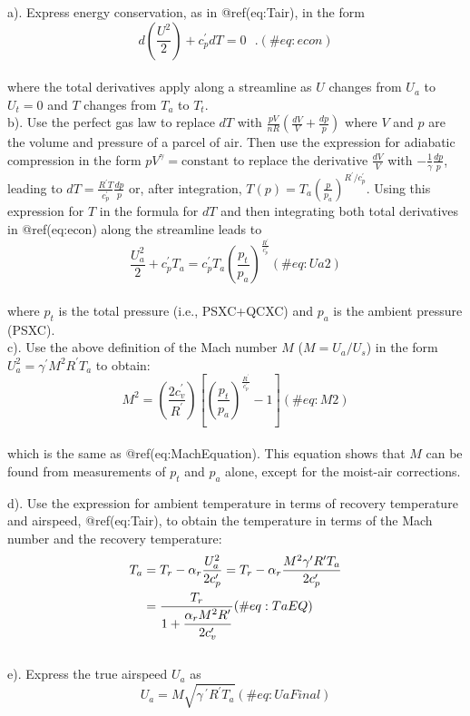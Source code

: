 \documentclass[
  english,
]{book}
\begin{document}
a). Express energy conservation, as in @ref(eq:Tair), in the form\\
\begin{equation}
d\left(\frac{U^{2}}{2}\right)+c_{p}^{\prime}dT=0\,\,\,\,.
(\#eq:econ)
\end{equation}\\
where the total derivatives apply along a streamline as \(U\) changes
from \(U_a\) to \(U_t=0\) and \(T\) changes from \(T_a\) to \(T_t\).\\
b). Use the perfect gas law to replace \(dT\) with
\(\frac{pV}{nR}(\frac{dV}{V}+\frac{dp}{p})\) where \(V\) and \(p\) are
the volume and pressure of a parcel of air. Then use the expression for
adiabatic compression in the form \(pV^\gamma = \mathrm{constant}\) to
replace the derivative \(\frac{dV}{V}\) with
\(-\frac{1}{\gamma}\frac{dp}{p}\), leading to
\(dT=\frac{R^{\prime}T}{c_{p}^{\prime}}\frac{dp}{p}\) or, after
integration,
\(T(p)=T_{a}\left(\frac{p}{p_{a}}\right)^{R^{\prime}/c_{p}^{\prime}}\).
Using this expression for \(T\) in the formula for \(dT\) and then
integrating both total derivatives in @ref(eq:econ) along the streamline
leads to\\
\begin{equation}
\frac{U_{a}^{2}}{2}+c_{p}^{\prime}T_{a}=c_{p}^{\prime}T_{a}\left(\frac{p_{t}}{p_{a}}\right)^{\frac{R^{\prime}}{c_{p}^{\prime}}}
(\#eq:Ua2)
\end{equation}\\
where \(p_t\) is the total pressure (i.e., PSXC+QCXC) and \(p_a\) is the
ambient pressure (PSXC).\\
c). Use the above definition of the Mach number \(M\) (\(M=U_a/U_s\)) in
the form \(U_a^2=\gamma^\prime M^2 R^\prime T_a\) to obtain:\\
\begin{equation}
M^{2}=\left(\frac{2c_{v}^{\prime}}{R^{\prime}}\right)\left[\left(\frac{p_{t}}{p_{a}}\right)^{\frac{R^{\prime}}{c_{p}^{\prime}}}-1\right]
(\#eq:M2)
\end{equation}\\
which is the same as @ref(eq:MachEquation). This equation shows that
\(M\) can be found from measurements of \(p_t\) and \(p_a\) alone,
except for the moist-air corrections.

d). Use the expression for ambient temperature in terms of recovery
temperature and airspeed, @ref(eq:Tair), to obtain the temperature in
terms of the Mach number and the recovery temperature:\\
\begin{align}
T_{a} & = T_{r}-\alpha_{r}\frac{U_{a}^{2}}{2c_{p}^{\prime}}=T_{r}-\alpha_{r}\frac{M^{2}\gamma^{\prime}R^{\prime}T_{a}}{2c_{p}^{\prime}}\notag\\  
& = \frac{T_{r}}{1+\dfrac{\alpha_{r}M^{2}R^{\prime}}{2c_{v}^{\prime}}}  
(\#eq:TaEQ)
\end{align} \\
e). Express the true airspeed \(U_a\) as\\
\begin{equation}
U_{a}=M\sqrt{\gamma\,^{\prime}R^{\prime}T_{a}}
(\#eq:UaFinal)
\end{equation}
\end{document}

